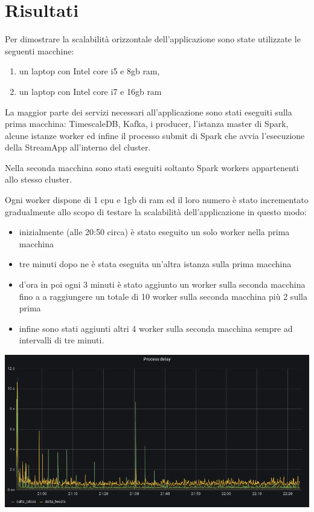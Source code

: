 \section{Risultati}

Per dimostrare la scalabilità orizzontale dell'applicazione sono state utilizzate le seguenti
macchine:

\begin{enumerate}
    \item un laptop con Intel core i5 e 8gb ram,
    \item un laptop con Intel core i7 e 16gb ram
\end{enumerate}

La maggior parte dei servizi necessari all'applicazione sono stati eseguiti sulla prima macchina:
TimescaleDB, Kafka, i producer, l'istanza master di Spark, alcune istanze worker ed
infine il processo submit di Spark che avvia l'esecuzione della StreamApp all'interno del cluster.

Nella seconda macchina sono stati eseguiti soltanto Spark workers appartenenti allo stesso cluster.

Ogni worker dispone di 1 cpu e 1gb di ram ed il loro numero è stato incrementato gradualmente
allo scopo di testare la scalabilità dell'applicazione in questo modo:

\begin{itemize}
    \item inizialmente (alle 20:50 circa) è stato eseguito un solo worker nella prima macchina
    \item tre minuti dopo ne è stata eseguita un'altra istanza sulla prima macchina
    \item d'ora in poi ogni 3 minuti è stato aggiunto un worker sulla seconda macchina fino a
          a raggiungere un totale di 10 worker sulla seconda macchina più 2 sulla prima
    \item infine sono stati aggiunti altri 4 worker sulla seconda macchina sempre ad intervalli di
          tre minuti.
\end{itemize}

\begin{center}
    \includegraphics[max width=\linewidth]{process_delay.png}
    \label{processdelay}
\end{center}


